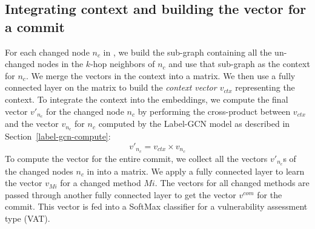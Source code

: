 

\subsection{Integrating context and building the vector for a commit}
\label{class:sec}

For each changed node $n_c$ in {\mvpdgxy}, we build the sub-graph
containing all the un-changed nodes in the $k$-hop neighbors of $n_c$
and use that sub-graph as the context for $n_c$. We merge the vectors
in the context into a matrix. We then use a fully connected layer on
the matrix to build the {\em context vector $v_{ctx}$} representing
the context.
To integrate the context into the embeddings, we compute the final
vector $v{'}_{n_{c}}$ for the changed node $n_c$ by performing the
cross-product between $v_{ctx}$ and the vector $v_{n_c}$ for $n_c$
computed by the Label-GCN model as described in
Section~\ref{label-gcn-compute}:$$v{'}_{n_c} = v_{ctx} \times
v_{n_c}$$
To compute the vector for the entire commit, we collect all
the vectors $v{'}_{n_c}$s of the changed nodes $n_c$ in {\mvpdgxy}
into a matrix. We apply a fully connected layer to learn
the vector $v_{Mi}$ for a changed method $Mi$. The vectors for all changed
methods are passed through another fully connected layer to get the
vector $v^{com}$ for the commit. This vector is fed
into a SoftMax classifier for a 
vulnerability assessment type (VAT).


